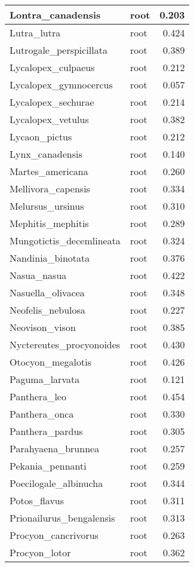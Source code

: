 \begin{table}
\begin{tabular}[t]{l|l|r}
\hline
Lontra\_canadensis & root & 0.203\\
\hline
Lutra\_lutra & root & 0.424\\
\hline
Lutrogale\_perspicillata & root & 0.389\\
\hline
Lycalopex\_culpaeus & root & 0.212\\
\hline
Lycalopex\_gymnocercus & root & 0.057\\
\hline
Lycalopex\_sechurae & root & 0.214\\
\hline
Lycalopex\_vetulus & root & 0.382\\
\hline
Lycaon\_pictus & root & 0.212\\
\hline
Lynx\_canadensis & root & 0.140\\
\hline
Martes\_americana & root & 0.260\\
\hline
Mellivora\_capensis & root & 0.334\\
\hline
Melursus\_ursinus & root & 0.310\\
\hline
Mephitis\_mephitis & root & 0.289\\
\hline
Mungotictis\_decemlineata & root & 0.324\\
\hline
Nandinia\_binotata & root & 0.376\\
\hline
Nasua\_nasua & root & 0.422\\
\hline
Nasuella\_olivacea & root & 0.348\\
\hline
Neofelis\_nebulosa & root & 0.227\\
\hline
Neovison\_vison & root & 0.385\\
\hline
Nyctereutes\_procyonoides & root & 0.430\\
\hline
Otocyon\_megalotis & root & 0.426\\
\hline
Paguma\_larvata & root & 0.121\\
\hline
Panthera\_leo & root & 0.454\\
\hline
Panthera\_onca & root & 0.330\\
\hline
Panthera\_pardus & root & 0.305\\
\hline
Parahyaena\_brunnea & root & 0.257\\
\hline
Pekania\_pennanti & root & 0.259\\
\hline
Poecilogale\_albinucha & root & 0.344\\
\hline
Potos\_flavus & root & 0.311\\
\hline
Prionailurus\_bengalensis & root & 0.313\\
\hline
Procyon\_cancrivorus & root & 0.263\\
\hline
Procyon\_lotor & root & 0.362\\

\end{tabular}
\end{table}
